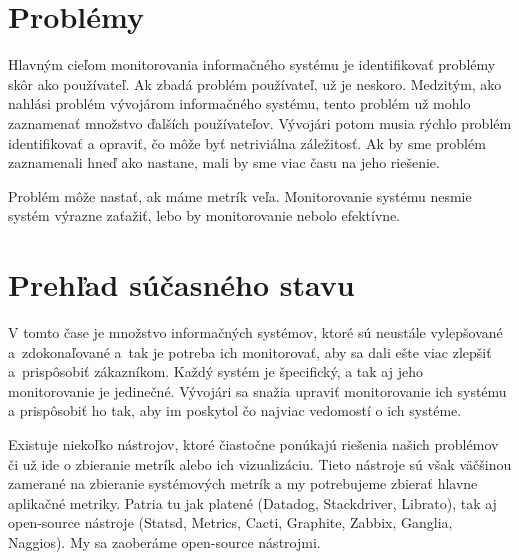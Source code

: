 \documentclass[a4paper, upjsfrontpage, disablespecwarning, thesismargins, thesislinespacing]{rnthesis}
\begin{document}

\section{Problémy}

Hlavným cieľom monitorovania informačného systému je identifikovať problémy skôr ako používateľ.
Ak zbadá problém používateľ, už je neskoro.
Medzitým, ako nahlási problém vývojárom informačného systému, tento problém už mohlo zaznamenať množstvo ďalších používateľov.
Vývojári potom musia rýchlo problém identifikovať a opraviť, čo môže byť netriviálna záležitosť.
Ak by sme problém zaznamenali hneď ako nastane, mali by sme viac času na jeho riešenie.

Problém môže nastať, ak máme metrík veľa.
Monitorovanie systému nesmie systém výrazne zaťažiť, lebo by monitorovanie nebolo efektívne.


 \section{Prehľad súčasného stavu}

V tomto čase je množstvo informačných systémov, ktoré sú neustále vylepšované a~zdokonaľované a~tak je potreba ich monitorovať, aby sa dali ešte viac zlepšiť a~prispôsobiť zákazníkom.
Každý systém je špecifický, a tak aj jeho monitorovanie je jedinečné.
Vývojári sa snažia upraviť monitorovanie ich systému a prispôsobiť ho tak, aby im poskytol čo najviac vedomostí o ich systéme.

Existuje niekoľko nástrojov, ktoré čiastočne ponúkajú riešenia našich problémov či už ide o zbieranie metrík alebo ich vizualizáciu.
Tieto nástroje sú však väčšinou zamerané na zbieranie systémových metrík a my potrebujeme zbierať hlavne aplikačné metriky.
Patria tu jak platené (Datadog, Stackdriver, Librato), tak aj open-source nástroje (Statsd, Metrics, Cacti, Graphite, Zabbix, Ganglia, Naggios).
My sa zaoberáme open-source nástrojmi.
\end{document}
